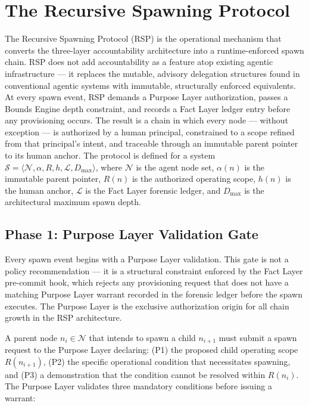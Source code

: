 \section{The Recursive Spawning Protocol}
\label{sec:rs-protocol}

The Recursive Spawning Protocol (RSP) is the operational mechanism that converts the three-layer \bxthree{} accountability architecture into a runtime-enforced spawn chain. RSP does not add accountability as a feature atop existing agentic infrastructure — it replaces the mutable, advisory delegation structures found in conventional agentic systems with immutable, structurally enforced equivalents. At every spawn event, RSP demands a Purpose Layer authorization, passes a Bounds Engine depth constraint, and records a Fact Layer ledger entry before any provisioning occurs. The result is a chain in which every node — without exception — is authorized by a human principal, constrained to a scope refined from that principal's intent, and traceable through an immutable parent pointer to its human anchor. The protocol is defined for a system $\mathcal{S} = \langle \mathcal{N}, \alpha, R, h, \mathcal{L}, D_{\max} \rangle$, where $\mathcal{N}$ is the agent node set, $\alpha(n)$ is the immutable parent pointer, $R(n)$ is the authorized operating scope, $h(n)$ is the human anchor, $\mathcal{L}$ is the Fact Layer forensic ledger, and $D_{\max}$ is the architectural maximum spawn depth.

\subsection{Phase 1: Purpose Layer Validation Gate}
\label{sec:rs-phase1}

Every spawn event begins with a Purpose Layer validation. This gate is not a policy recommendation — it is a structural constraint enforced by the Fact Layer pre-commit hook, which rejects any provisioning request that does not have a matching Purpose Layer warrant recorded in the forensic ledger before the spawn executes. The Purpose Layer is the exclusive authorization origin for all chain growth in the RSP architecture.

A parent node $n_i \in \mathcal{N}$ that intends to spawn a child $n_{i+1}$ must submit a spawn request to the Purpose Layer declaring: (P1) the proposed child operating scope $R(n_{i+1})$, (P2) the specific operational condition that necessitates spawning, and (P3) a demonstration that the condition cannot be resolved within $R(n_i)$. The Purpose Layer validates three mandatory conditions before issuing a warrant:

